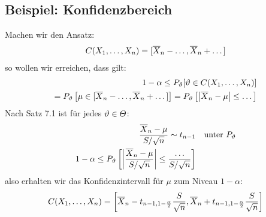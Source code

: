 \subsection{Beispiel: Konfidenzbereich}
Machen wir den Ansatz:
\begin{align*}
  C (X_1, \dots, X_n) = [\overline{X}_n - \dots, \overline{X}_n + \dots]
\end{align*}
so wollen wir erreichen, dass gilt:
\begin{align*}
  1 - \alpha \leq P_\vartheta[\vartheta \in  C (X_1, \dots, X_n)] \\
  = P_\vartheta \left[ \mu \in [\overline{X}_n - \dots, \overline{X}_n + \dots] \right]
  = P_\vartheta \left[ \abs{\overline{X}_n - \mu} \leq \dots \right]
\end{align*}
Nach Satz 7.1 ist für jedes $\vartheta \in \varTheta$:
\begin{align*}
  \frac{\overline{X}_n - \mu}{S / \sqrt{n}} \sim t_{n-1} &  & \text{unter } P_\vartheta \\
  1 - \alpha \leq P_\vartheta \left[ \abs{\frac{\overline{X}_n - \mu}{S / \sqrt{n}}} \leq \frac{\dots}{S / \sqrt{n}} \right]
\end{align*}
also erhalten wir das Konfidenzintervall für $\mu$ zum Niveau $1 - \alpha$:
\begin{align*}
  C (X_1, \dots, X_n) = \left[ \overline{X}_n - t_{n-1, 1 - \frac{\alpha}{2}} \frac{S}{\sqrt{n}}, \overline{X}_n + t_{n-1, 1 - \frac{\alpha}{2}} \frac{S}{\sqrt{n}} \right]
\end{align*}
\BoxEnd{}

